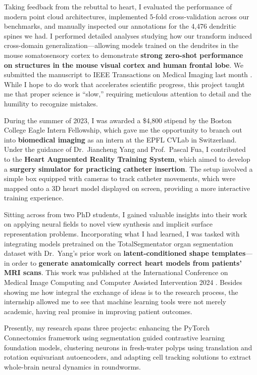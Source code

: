 \documentclass[letterpaper,11pt]{article}
\begin{document}
Taking feedback from the rebuttal to heart, I evaluated the performance of modern point cloud architectures, implemented 5-fold cross-validation across our benchmarks, and manually inspected our annotations for the 4,476 dendritic spines we had. I performed detailed analyses studying how our transform induced cross-domain generalization---allowing models trained on the dendrites in the mouse somatosensory cortex to demonstrate \textbf{strong zero-shot performance on structures in the mouse visual cortex and human frontal lobe}. We submitted the manuscript to IEEE Transactions on Medical Imaging last month . While I hope to do work that accelerates scientific progress, this project taught me that proper science is “slow,” requiring meticulous attention to detail and the humility to recognize mistakes.

During the summer of 2023, I was awarded a \$4,800 stipend by the Boston College Eagle Intern Fellowship, which gave me the opportunity to branch out into \textbf{biomedical imaging} as an intern at the EPFL CVLab in Switzerland. Under the guidance of Dr.\ Jiancheng Yang and Prof.\ Pascal Fua, I contributed to the \textbf{Heart Augmented Reality Training System}, which aimed to develop a \textbf{surgery simulator for practicing catheter insertion}. The setup involved a simple box equipped with cameras to track catheter movements, which were mapped onto a 3D heart model displayed on screen, providing a more interactive training experience.

Sitting across from two PhD students, I gained valuable insights into their work on applying neural fields to novel view synthesis and implicit surface representation problems. Incorporating what I had learned, I was tasked with integrating models pretrained on the TotalSegmentator organ segmentation dataset with Dr.\ Yang’s prior work on \textbf{latent-conditioned shape templates}---in order to \textbf{generate anatomically correct heart models from patients’ MRI scans}. This work was published at the International Conference on Medical Image Computing and Computer Assisted Intervention 2024 . Besides showing me how integral the exchange of ideas is to the research process, the internship allowed me to see that machine learning tools were not merely academic, having real promise in improving patient outcomes.

Presently, my research spans three projects: enhancing the PyTorch Connectomics framework using segmentation guided contrastive learning foundation models, clustering neurons in fresh-water polyps using translation and rotation equivariant autoencoders, and adapting cell tracking solutions to extract whole-brain neural dynamics in roundworms.
\end{document}
